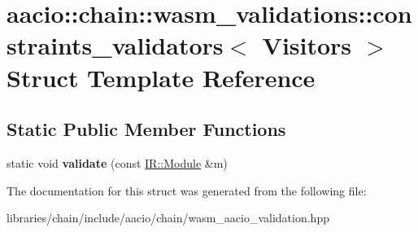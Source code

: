 \hypertarget{structaacio_1_1chain_1_1wasm__validations_1_1constraints__validators}{}\section{aacio\+:\+:chain\+:\+:wasm\+\_\+validations\+:\+:constraints\+\_\+validators$<$ Visitors $>$ Struct Template Reference}
\label{structaacio_1_1chain_1_1wasm__validations_1_1constraints__validators}
\subsection*{Static Public Member Functions}
\begin{DoxyCompactItemize}
\item 
\mbox{\label{structaacio_1_1chain_1_1wasm__validations_1_1constraints__validators_a0c4af50b25d92e5fb65e9eb18d37e4c2}} 
static void {\bfseries validate} (const \mbox{\hyperlink{struct_i_r_1_1_module}{I\+R\+::\+Module}} \&m)
\end{DoxyCompactItemize}


The documentation for this struct was generated from the following file\+:\begin{DoxyCompactItemize}
\item 
libraries/chain/include/aacio/chain/wasm\+\_\+aacio\+\_\+validation.\+hpp\end{DoxyCompactItemize}
